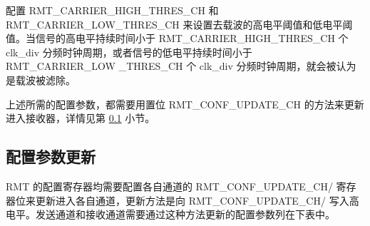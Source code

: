 \documentclass[main\_\_CN.tex]{subfiles}
\begin{document}
配置 RMT\_CARRIER\_HIGH\_THRES\_CH 和 RMT\_CARRIER\_LOW\_THRES\_CH  来设置去载波的高电平阈值和低电平阈值。当信号的高电平持续时间小于 RMT\_CARRIER\_HIGH\_THRES\_CH 个 clk\_div 分频时钟周期，或者信号的低电平持续时间小于 RMT\_CARRIER\_LOW \_THRES\_CH 个 clk\_div 分频时钟周期，就会被认为是载波被滤除。

上述所需的配置参数，都需要用置位 RMT\_CONF\_UPDATE\_CH 的方法来更新进入接收器，详情见第 \ref{conf_update} 小节。

\subsection{配置参数更新}\label{conf_update}
RMT 的配置寄存器均需要配置各自通道的 RMT\_CONF\_UPDATE\_CH/ 寄存器位来更新进入各自通道，更新方法是向 RMT\_CONF\_UPDATE\_CH/ 写入高电平。发送通道和接收通道需要通过这种方法更新的配置参数列在下表中。
\end{document}
